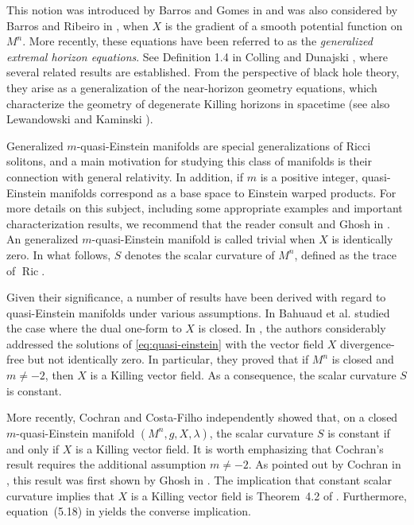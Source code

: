 \documentclass[a4paper, 12pt]{amsart}
\theoremstyle{definition}
\numberwithin{figure}{section}
\begin{document}
This notion was introduced by Barros and Gomes in \cite{BarrosGomes} and was also considered by Barros and Ribeiro in \cite{BarrosRibeiro2014}, when $X$ is the gradient of a smooth potential function on $M^n.$ More recently, these equations have been referred to as the \emph{generalized extremal horizon equations}. See Definition 1.4 in Colling and Dunajski \cite{colling2025quasi}, where several related results are established. From the perspective of black hole theory, they arise as a generalization of the near-horizon geometry equations, which characterize the geometry of degenerate Killing horizons in spacetime (see also Lewandowski and Kaminski \cite{kaminski2024extreme}). 

Generalized $m$-quasi-Einstein manifolds are special generalizations of Ricci solitons, and a main motivation for studying this class of manifolds is their connection with general relativity. In addition, if $m$ is a positive integer, quasi-Einstein manifolds correspond as a base space to Einstein warped products. For more details on this subject, including some appropriate examples and important characterization results, we recommend that the reader consult \cite{BarrosGomes, BarrosRibeiro2014} and Ghosh in \cite{ghosh,Gho20}. An generalized $m$-quasi-Einstein manifold is called trivial when $X$ is identically zero. In what follows, $S$ denotes the scalar curvature of $M^n$, defined as the trace of $\operatorname{Ric}$.

Given their significance, a number of results have been derived with regard to quasi-Einstein manifolds under various assumptions. In \cite{bahuaud2022static} Bahuaud et al. studied the case where the dual one-form to $X$ is closed. In \cite{Bahuaud2024}, the authors considerably addressed the solutions of \eqref{eq:quasi-einstein} with the vector field $X$ divergence-free but not identically zero. In particular, they proved that if $M^n$ is closed and $m \neq -2$, then $X$ is a Killing vector field. As a consequence, the scalar curvature $S$ is constant.

More recently, Cochran \cite{Cochran2025} and Costa-Filho \cite{CostaFilho2024} independently showed that, on a closed $m$-quasi-Einstein manifold $(M^n,g,X,\lambda)$, the scalar curvature $S$ is constant if and only if $X$ is a Killing vector field. It is worth emphasizing that Cochran’s result requires the additional assumption $m \neq -2$. 
As pointed out by Cochran in \cite{Cochran2026}, this result was first shown by Ghosh in \cite{Gho20}. The implication that constant scalar curvature implies that $X$ is a Killing vector field is Theorem~4.2 of \cite{Gho20}. Furthermore, equation~(5.18) in \cite{Gho20} yields the converse implication.
\end{document}
